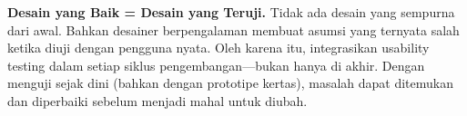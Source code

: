 \begin{konsep}
\textbf{Desain yang Baik = Desain yang Teruji.} Tidak ada desain yang sempurna dari awal. Bahkan desainer berpengalaman membuat asumsi yang ternyata salah ketika diuji dengan pengguna nyata. Oleh karena itu, integrasikan usability testing dalam setiap siklus pengembangan---bukan hanya di akhir. Dengan menguji sejak dini (bahkan dengan prototipe kertas), masalah dapat ditemukan dan diperbaiki sebelum menjadi mahal untuk diubah.
\end{konsep}
